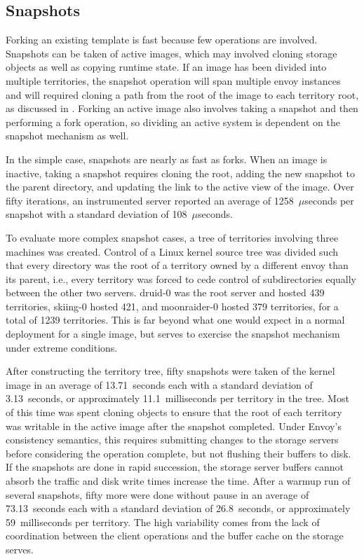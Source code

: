 \subsection{Snapshots}

Forking an existing template is fast because few operations are involved. Snapshots can be taken of active images, which may involved cloning storage objects as well as copying runtime state. If an image has been divided into multiple territories, the snapshot operation will span multiple envoy instances and will required cloning a path from the root of the image to each territory root, as discussed in . Forking an active image also involves taking a snapshot and then performing a fork operation, so dividing an active system is dependent on the snapshot mechanism as well.

In the simple case, snapshots are nearly as fast as forks. When an image is inactive, taking a snapshot requires cloning the root, adding the new snapshot to the parent directory, and updating the link to the active view of the image. Over fifty iterations, an instrumented server reported an average of 1258~$\mu$seconds per snapshot with a standard deviation of 108~$\mu$seconds.

To evaluate more complex snapshot cases, a tree of territories involving three machines was created. Control of a Linux kernel source tree was divided such that every directory was the root of a territory owned by a different envoy than its parent, i.e., every territory was forced to cede control of subdirectories equally between the other two servers. druid-0 was the root server and hosted 439 territories, skiing-0 hosted 421, and moonraider-0 hosted 379 territories, for a total of 1239 territories. This is far beyond what one would expect in a normal deployment for a single image, but serves to exercise the snapshot mechanism under extreme conditions.

After constructing the territory tree, fifty snapshots were taken of the kernel image in an average of 13.71~seconds each with a standard deviation of 3.13~seconds, or approximately 11.1~milliseconds per territory in the tree. Most of this time was spent cloning objects to ensure that the root of each territory was writable in the active image after the snapshot completed. Under Envoy's consistency semantics, this requires submitting changes to the storage servers before considering the operation complete, but not flushing their buffers to disk. If the snapshots are done in rapid succession, the storage server buffers cannot absorb the traffic and disk write times increase the time. After a warmup run of several snapshots, fifty more were done without pause in an average of 73.13~seconds each with a standard deviation of 26.8~seconds, or approximately 59~milliseconds per territory. The high variability comes from the lack of coordination between the client operations and the buffer cache on the storage serves.

